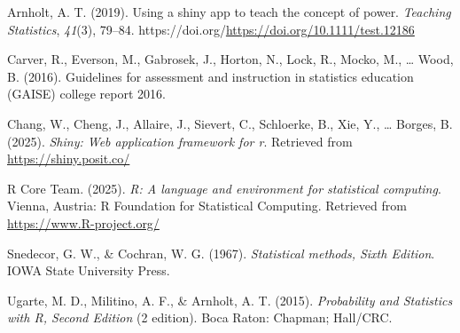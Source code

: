 \documentclass[
]{article}
\newlength{\cslhangindent}
\newenvironment{CSLReferences}[2] %
 {\begin{list}{}{%
  \setlength{\itemindent}{0pt}
  \setlength{\leftmargin}{0pt}
  \setlength{\parsep}{0pt}
  \ifodd #1
   \setlength{\leftmargin}{\cslhangindent}
   \setlength{\itemindent}{-1\cslhangindent}
  \fi
  \setlength{\itemsep}{#2\baselineskip}}}
 {\end{list}}
\begin{document}
\label{refs}
\begin{CSLReferences}{1}{0}
Arnholt, A. T. (2019). Using a shiny app to teach the concept of power. \emph{Teaching Statistics}, \emph{41}(3), 79--84. https://doi.org/\url{https://doi.org/10.1111/test.12186}

Carver, R., Everson, M., Gabrosek, J., Horton, N., Lock, R., Mocko, M., \ldots{} Wood, B. (2016). Guidelines for assessment and instruction in statistics education (GAISE) college report 2016.

Chang, W., Cheng, J., Allaire, J., Sievert, C., Schloerke, B., Xie, Y., \ldots{} Borges, B. (2025). \emph{Shiny: Web application framework for r}. Retrieved from \url{https://shiny.posit.co/}

R Core Team. (2025). \emph{R: A language and environment for statistical computing}. Vienna, Austria: R Foundation for Statistical Computing. Retrieved from \url{https://www.R-project.org/}

Snedecor, G. W., \& Cochran, W. G. (1967). \emph{Statistical methods, {Sixth} {Edition}}. IOWA State University Press.

Ugarte, M. D., Militino, A. F., \& Arnholt, A. T. (2015). \emph{Probability and {Statistics} with {R}, {Second} {Edition}} (2 edition). Boca Raton: Chapman; Hall/CRC.

\end{CSLReferences}
\end{document}
